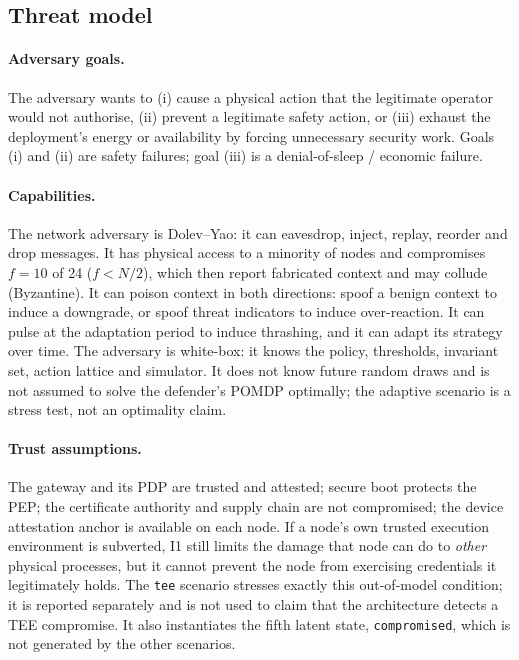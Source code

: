 \subsection{Threat model}
\label{sec:threat-model-details}

\paragraph{Adversary goals.} The adversary wants to (i) cause a physical action
that the legitimate operator would not authorise, (ii) prevent a legitimate
safety action, or (iii) exhaust the deployment's energy or availability by
forcing unnecessary security work. Goals (i) and (ii) are safety failures; goal
(iii) is a denial-of-sleep / economic failure.

\paragraph{Capabilities.} The network adversary is Dolev--Yao: it can eavesdrop,
inject, replay, reorder and drop messages. It has physical access to a minority
of nodes and compromises $f=10$ of 24 ($f< N/2$), which then report fabricated
context and may collude (Byzantine). It can poison context in both directions:
spoof a benign context to induce a downgrade, or spoof threat indicators to
induce over-reaction. It can pulse at the adaptation period to induce thrashing,
and it can adapt its strategy over time. The adversary is white-box: it knows
the policy, thresholds, invariant set, action lattice and simulator. It does not
know future random draws and is not assumed to solve the defender's POMDP
optimally; the adaptive scenario is a stress test, not an optimality claim.

\paragraph{Trust assumptions.} The gateway and its PDP are trusted and
attested; secure boot protects the PEP; the certificate authority and supply
chain are not compromised; the device attestation anchor is available on each
node. If a node's own trusted execution environment is subverted, I1 still
limits the damage that node can do to \emph{other} physical processes, but it
cannot prevent the node from exercising credentials it legitimately holds. The
\texttt{tee} scenario stresses exactly this out-of-model condition; it is
reported separately and is not used to claim that the architecture detects a
TEE compromise. It also instantiates the fifth latent state, \texttt{compromised},
which is not generated by the other scenarios.

